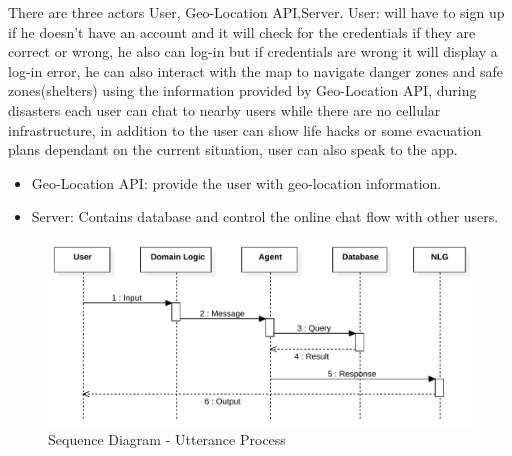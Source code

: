 \documentclass{scrreprt}
\begin{document}
There are three actors User, Geo-Location API,Server. User: will have to sign up if he doesn't have an account and it will check for the credentials if they are correct or wrong, he also can log-in but if credentials are wrong it will display a log-in error,
he can also interact with the map to navigate danger zones and safe zones(shelters) using the information provided by Geo-Location API, during disasters each user can chat to nearby users while there are no cellular infrastructure, in addition to the user can show life hacks or some evacuation plans dependant on the current situation, user can also speak to the app.
\begin{itemize}
    \item Geo-Location API: provide the user with geo-location information.
    \item Server: Contains database and control the online chat flow with other users.
\end{itemize}


\clearpage
\begin{figure}[ht!]
    \centering
    \includegraphics[angle=90, height=.95\textheight]{img3/SequenceDiagram2.pdf}
    \caption{Sequence Diagram - Utterance Process}
    \label{fig:sequence2}
\end{figure}




\clearpage
\end{document}
